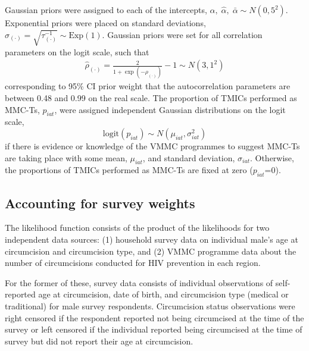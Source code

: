 \documentclass{article}
\begin{document}
\begin{appendix}
\noindent Gaussian priors were assigned to each of the intercepts, $\alpha, \;\hat{\alpha}, \;\bar{\alpha} \sim N(0, 5^2)$. Exponential priors were placed on standard deviations, $\sigma_{(\cdot)} = \sqrt{\tau^{-1}_{(\cdot)}} \sim \text{Exp}(1)$. Gaussian priors were set for all correlation parameters on the logit scale, such that 
\begin{align*} 
  \hat{\rho}_{(\cdot)} = \frac{2}{1 + \exp(-\rho_{(\cdot)})} - 1 \sim N(3, 1^2)
\end{align*}
corresponding to 95\% CI prior weight that the autocorrelation parameters are between 0.48 and 0.99 on the real scale. The proportion of TMICs performed as MMC-Ts, $p_{iat}$, were assigned independent Gaussian distributions on the logit scale, 
\begin{equation*} 
  	\text{logit}(p_{iat}) \sim N(\mu_{iat}, \sigma_{iat}^2) 
\end{equation*}
if there is evidence or knowledge of the VMMC programmes to suggest MMC-Ts are taking place with some mean, $\mu_{iat}$, and standard deviation, $\sigma_{iat}$. Otherwise, the proportions of TMICs performed as MMC-Ts are fixed at zero ($p_{iat}$=0).


\subsection{Accounting for survey weights}


The likelihood function consists of the product of the likelihoods for two independent data sources: (1) household survey data on individual male's age at circumcision and circumcision type, and (2) VMMC programme data about the number of circumcisions conducted for HIV prevention in each region.

\noindent For the former of these, survey data consists of individual observations of self-reported age at circumcision, date of birth, and circumcision type (medical or traditional) for male survey respondents. Circumcision status observations were right censored if the respondent reported not being circumcised at the time of the survey or left censored if the individual reported being circumcised at the time of survey but did not report their age at circumcision.


\end{appendix}
\end{document}
